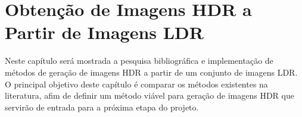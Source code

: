 \chapter{Obtenção de Imagens HDR a Partir de Imagens LDR} \label{parteHDR}
Neste capítulo será mostrada a pesquisa bibliográfica e implementação de métodos de geração de imagens HDR a partir de um conjunto de imagens LDR. O principal objetivo deste capítulo é comparar os métodos existentes na literatura, afim de definir um método viável para geração de imagens HDR que servirão de entrada para a próxima etapa do projeto.
